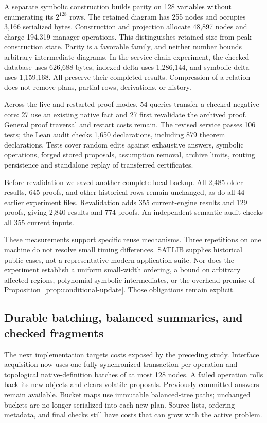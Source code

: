 \documentclass[11pt,a4paper]{article}
\numberwithin{equation}{section}
\theoremstyle{plain}
\theoremstyle{definition}
\theoremstyle{remark}
\begin{document}
A separate symbolic construction builds parity on 128 variables without enumerating its $2^{128}$ rows. The retained diagram has 255 nodes and occupies 3,166 serialized bytes. Construction and projection allocate 48,897 nodes and charge 194,319 manager operations. This distinguishes retained size from peak construction state. Parity is a favorable family, and neither number bounds arbitrary intermediate diagrams. In the service chain experiment, the checked database uses 626,688 bytes, indexed delta uses 1,286,144, and symbolic delta uses 1,159,168. All preserve their completed results. Compression of a relation does not remove plans, partial rows, derivations, or history.

Across the live and restarted proof modes, 54 queries transfer a checked negative core: 27 use an existing native fact and 27 first revalidate the archived proof. General proof traversal and restart costs remain. The revised service passes 106 tests; the Lean audit checks 1,650 declarations, including 879 theorem declarations. Tests cover random edits against exhaustive answers, symbolic operations, forged stored proposals, assumption removal, archive limits, routing persistence and standalone replay of transferred certificates.

Before revalidation we saved another complete local backup. All 2,485 older results, 645 proofs, and other historical rows remain unchanged, as do all 44 earlier experiment files. Revalidation adds 355 current-engine results and 129 proofs, giving 2,840 results and 774 proofs. An independent semantic audit checks all 355 current inputs.

These measurements support specific reuse mechanisms. Three repetitions on one machine do not resolve small timing differences. SATLIB supplies historical public cases, not a representative modern application suite. Nor does the experiment establish a uniform small-width ordering, a bound on arbitrary affected regions, polynomial symbolic intermediates, or the overhead premise of Proposition~\ref{prop:conditional-update}. Those obligations remain explicit.

\subsection{Durable batching, balanced summaries, and checked fragments}
\label{sec:followup-study}

The next implementation targets costs exposed by the preceding study. Interface acquisition now uses one fully synchronized transaction per operation and topological native-definition batches of at most 128 nodes. A failed operation rolls back its new objects and clears volatile proposals. Previously committed answers remain available. Bucket maps use immutable balanced-tree paths; unchanged buckets are no longer serialized into each new plan. Source lists, ordering metadata, and final checks still have costs that can grow with the active problem.
\end{document}
